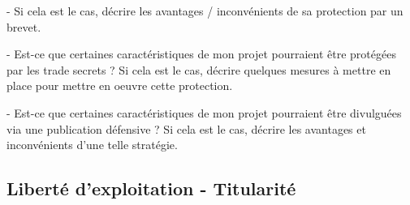 - Si cela est le cas, décrire les avantages / inconvénients de sa protection par un brevet.

- Est-ce que certaines caractéristiques de mon projet pourraient être protégées par les trade secrets ? Si cela est le cas, décrire quelques mesures à mettre en place pour mettre en oeuvre cette protection.

- Est-ce que certaines caractéristiques de mon projet pourraient être divulguées via une publication défensive ? Si cela est le cas, décrire les avantages et inconvénients d’une telle stratégie.

\subsection{Liberté d'exploitation - Titularité}

